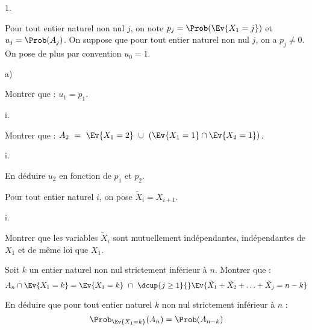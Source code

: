\documentclass[11pt]{article}%
\begin{document}
\begin{noliste}{1.}
  \setlength{\itemsep}{2mm} \setcounter{enumi}{3}
\item Pour tout entier naturel non nul $j$, on note
  $p_j=\Prob(\Ev{X_1=j})$ et $u_j=\Prob(A_j)$. On suppose que pour
  tout entier naturel non nul $j$, on a $p_j \neq 0$. On pose de plus
  par convention $u_0=1$.
  \begin{noliste}{a)}
  \item Montrer que : $u_1 = p_1$.\\[-.8cm]

    
    



  \item
    \begin{nonoliste}{i.}
    \item Montrer que : $A_2 \ = \ \Ev{X_1=2} \ \cup \
      \left(\Ev{X_1=1} \cap \Ev{X_2=1}\right)$.
      \end{nonoliste}

      

      \begin{nonoliste}{i.}
        \setcounter{enumiii}{1}
    \item En déduire $u_2$ en fonction de $p_1$ et $p_2$.

      
    \end{nonoliste}




  \item Pour tout entier naturel $i$, on pose $\tilde{X}_i= X_{i+1}$.
    \begin{nonoliste}{i.}
    \item Montrer que les variables $\tilde{X}_i$ sont mutuellement
      indépendantes, indépendantes de $X_1$ et de même loi que $X_1$.

      

    \item Soit $k$ un entier naturel non nul strictement inférieur à
      $n$. Montrer que :
      \[
      A_n \cap \Ev{X_1=k}=\Ev{X_1=k} \ \cap \ \dcup{j \geq 1}{}
      \Ev{\tilde{X}_1+\tilde{X}_2+ \ldots +\tilde{X}_j=n-k}
      \]

      

    \item En déduire que pour tout entier naturel $k$ non nul
      strictement inférieur à $n$ :
      \[
      \Prob_{\Ev{X_1=k}}(A_n) = \Prob(A_{n-k})
      \]

      


\end{nonoliste}
\end{noliste}
\end{noliste}
\end{document}
